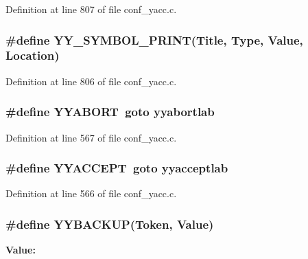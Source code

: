 Definition at line 807 of file conf\_\-yacc.c.
\subsubsection[{YY\_\-SYMBOL\_\-PRINT}]{\setlength{\rightskip}{0pt plus 5cm}\#define YY\_\-SYMBOL\_\-PRINT(Title, \/  Type, \/  Value, \/  Location)}\label{conf__yacc_8c_1c510d33cb388afc9411141ba3076a36}




Definition at line 806 of file conf\_\-yacc.c.
\subsubsection[{YYABORT}]{\setlength{\rightskip}{0pt plus 5cm}\#define YYABORT~goto yyabortlab}\label{conf__yacc_8c_3bcde0b05b9aa4ec5169092d9d211dbd}




Definition at line 567 of file conf\_\-yacc.c.
\subsubsection[{YYACCEPT}]{\setlength{\rightskip}{0pt plus 5cm}\#define YYACCEPT~goto yyacceptlab}\label{conf__yacc_8c_a6c7a65b580c214b2ea832fd7bdd472e}




Definition at line 566 of file conf\_\-yacc.c.
\subsubsection[{YYBACKUP}]{\setlength{\rightskip}{0pt plus 5cm}\#define YYBACKUP(Token, \/  Value)}\label{conf__yacc_8c_dfcaf974b837e3efc130377e9837b4fd}


\textbf{Value:}

